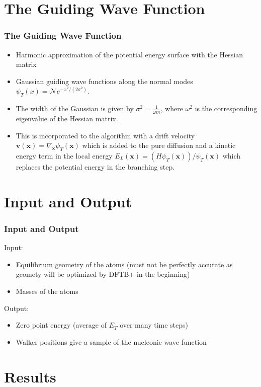 \documentclass{beamer}
\begin{document}
\section{The Guiding Wave Function}
\begin{frame}
\frametitle{The Guiding Wave Function}
\begin{itemize}
\item Harmonic approximation of the potential energy surface with the Hessian matrix
\item Gaussian guiding wave functions along the normal modes $\psi_T(x) = \mathcal{N} e^{-x^2/(2 \sigma^2)}$.
\item The width of the Gaussian is given by $\sigma^2 = \frac{1}{\omega m}$, where $\omega^2$ is the corresponding eigenvalue of the Hessian matrix.
\item This is incorporated to the algorithm with a drift velocity $\bm{v}(\bm{x}) = \nabla_{\bm{x}} \psi_T(\bm{x})$ which is added to the pure diffusion and a kinetic energy term in the local energy $E_L(\bm{x}) = (H\psi_T(\bm{x}))/\psi_T(\bm{x})$ which replaces the potential energy in the branching step.

\end{itemize} 

\end{frame}

\section{Input and Output}
\begin{frame}
\frametitle{Input and Output}
Input:\\
\begin{itemize}
\item Equilibrium geometry of the atoms (must not be perfectly accurate as geomety will be optimized by DFTB+ in the beginning)
\item Masses of the atoms
\end{itemize}
Output:
\begin{itemize}
\item Zero point energy (average of $E_T$ over many time steps)
\item Walker positions give a sample of the nucleonic wave function
\end{itemize}
\end{frame}

\section{Results}
\end{document}
